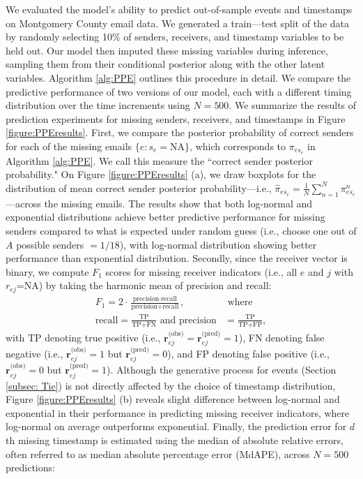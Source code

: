 \documentclass[ba]{imsart}
\numberwithin{equation}{section}
\theoremstyle{plain}
\begin{document}
	We evaluated the model’s ability to predict out-of-sample events and timestamps on Montgomery County email data. We generated a train—test split of the data by randomly selecting 10\% of senders, receivers, and timestamp variables to be held out. Our model then imputed these missing variables during inference, sampling them from their conditional posterior along with the other latent variables. Algorithm \ref{alg:PPE} outlines this procedure in detail. We compare the predictive performance of two versions of our model, each with a different timing distribution over the time increments using $N=500$. We summarize the results of prediction experiments for missing senders, receivers, and timestamps in Figure \ref{figure:PPEresults}. First, we compare the posterior probability of correct senders for each of the missing emails $\{e:s_e=\mbox{NA}\}$, which corresponds to $\pi_{es_e}$ in Algorithm \ref{alg:PPE}. We call this measure the ``correct sender posterior probability." On Figure \ref{figure:PPEresults} (a), we draw boxplots for the distribution of mean correct sender posterior probability---i.e., $\hat{\pi}_{es_{e}} = \frac{1}{N}\sum_{n=1}^N \pi^n_{es_{e}}$---across the missing emails. The results show that both log-normal and exponential distributions achieve better predictive performance for missing senders compared to what is expected under random guess (i.e., choose one out of $A$ possible senders $=1/18$), with log-normal distribution showing better performance than exponential distribution. Secondly, since the receiver vector is binary, we compute $F_1$ scores for missing receiver indicators (i.e., all $e$ and $j$ with $r_{ej}$=NA) by taking the harmonic mean of precision and recall:
	\begin{equation}
		\begin{aligned}
			F_1 =2\cdot\frac{\mbox{precision}\cdot \mbox{recall}}{\mbox{precision}+ \mbox{recall}}, &\mbox{ where } \\
			\mbox{recall}  = \frac{\mbox{TP}}{\mbox{TP+FN}} \mbox{ and } \mbox{precision} & =\frac{\mbox{TP}}{\mbox{TP+FP}},
		\end{aligned}
	\end{equation}
with TP denoting true positive (i.e., $\boldsymbol{r}^{\textrm{(obs)}}_{ej}=\boldsymbol{r}^{\textrm{(pred)}}_{ej}=1$), FN denoting false negative (i.e., $\boldsymbol{r}^{\textrm{(obs)}}_{ej}=1$ but $\boldsymbol{r}^{\textrm{(pred)}}_{ej}=0$), and FP denoting false positive (i.e., $\boldsymbol{r}^{\textrm{(obs)}}_{ej}=0$ but $\boldsymbol{r}^{\textrm{(pred)}}_{ej}=1$). Although the generative process for events (Section \ref{subsec: Tie}) is not directly affected by the choice of timestamp distribution, Figure \ref{figure:PPEresults} (b) reveals slight difference between log-normal and exponential in their performance in predicting missing receiver indicators, where log-normal on average outperforms exponential. Finally, the prediction error for $d$th missing timestamp is estimated using the median of absolute relative errors, often referred to as  median absolute percentage error (MdAPE), across $N=500$ predictions:
\end{document}
